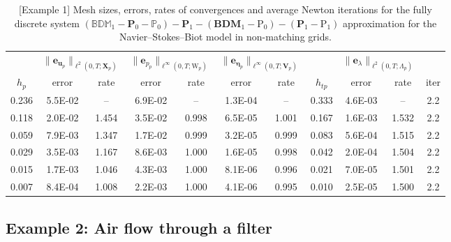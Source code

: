 \documentclass[11pt]{article}
\numberwithin{equation}{section}
\newcommand{\bbeta}{{\boldsymbol\eta}}
\newcommand{\bu}{\mathbf{u}}
\newcommand{\be}{{\mathbf{e}}}
\newcommand{\0}{{\mathbf{0}}}
\def\bX{\mathbf{X}}
\def\bV{\mathbf{V}}
\def\bP{\mathbf{P}}
\newcommand\bbP{\mathbb{P}}
\def\W{\mathrm{W}}
\def\rP{\mathrm{P}}
\def\bBDM{\mathbf{BDM}}
\def\bbBDM{\mathbb{BDM}}
\numberwithin{equation}{section}
\begin{document}
\begin{table}[ht]
\begin{center}
{\begin{tabular}{|c||cc|cc|cc||c||cc||c|}
\hline
& \multicolumn{2}{|c|}{$\|\be_{\bu_p}\|_{\ell^2(0,T;\bX_p)}$} 
& \multicolumn{2}{|c|}{$\|\be_{p_p}\|_{\ell^\infty(0,T;\W_p)}$}   
& \multicolumn{2}{|c||}{$\|\be_{\bbeta_p}\|_{\ell^\infty(0,T;\bV_p)}$}
&
& \multicolumn{2}{|c||}{$\|\be_{\lambda}\|_{\ell^2(0,T;\Lambda_p)}$}  & \\ 
$h_p$  & error  & rate & error & rate & error & rate & $h_{tp}$ & error & rate & iter  \\  \hline
0.236 & 5.5E-02 &   --  & 6.9E-02 &   --  & 1.3E-04 &   --  & 0.333 & 4.6E-03 &   --  & 2.2 \\
0.118 & 2.0E-02 & 1.454 & 3.5E-02 & 0.998 & 6.5E-05 & 1.001 & 0.167 & 1.6E-03 & 1.532 & 2.2 \\
0.059 & 7.9E-03 & 1.347 & 1.7E-02 & 0.999 & 3.2E-05 & 0.999 & 0.083 & 5.6E-04 & 1.515 & 2.2 \\
0.029 & 3.5E-03 & 1.167 & 8.6E-03 & 1.000 & 1.6E-05 & 0.998 & 0.042 & 2.0E-04 & 1.504 & 2.2 \\
0.015 & 1.7E-03 & 1.046 & 4.3E-03 & 1.000 & 8.1E-06 & 0.996 & 0.021 & 7.0E-05 & 1.501 & 2.2 \\
0.007 & 8.4E-04 & 1.008 & 2.2E-03 & 1.000 & 4.1E-06 & 0.995 & 0.010 & 2.5E-05 & 1.500 & 2.2 \\
\hline 
\end{tabular}
%
\caption{[Example 1] Mesh sizes, errors, rates of convergences and average Newton iterations for the fully discrete system $(\bbBDM_1-\bP_0-\bbP_0)-\bP_1-(\bBDM_1-\rP_0) - (\bP_1 - \rP_1)$ approximation for the Navier--Stokes--Biot model in non-matching grids.}\label{table1-example1}
}
\end{center}
\end{table}


\subsection{Example 2: Air flow through a filter}
\end{document}
